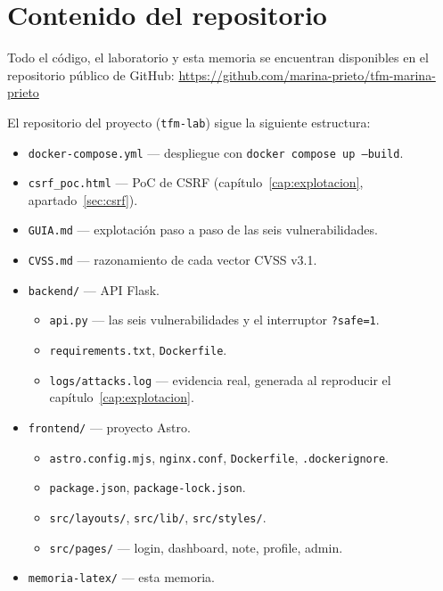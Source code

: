 \chapter*{Contenido del repositorio}

Todo el código, el laboratorio \breachlab y esta memoria se encuentran
disponibles en el repositorio público de GitHub: 
\url{https://github.com/marina-prieto/tfm-marina-prieto}

El repositorio del proyecto (\texttt{tfm-lab}) 
sigue la siguiente estructura:

\begin{itemize}
\item \texttt{docker-compose.yml} — despliegue con \texttt{docker compose up
  --build}.
\item \texttt{csrf\_poc.html} — PoC de CSRF (capítulo~\ref{cap:explotacion},
  apartado~\ref{sec:csrf}).
\item \texttt{GUIA.md} — explotación paso a paso de las seis
  vulnerabilidades.
\item \texttt{CVSS.md} — razonamiento de cada vector CVSS v3.1.
\item \texttt{backend/} — API Flask.
  \begin{itemize}
  \item \texttt{api.py} — las seis vulnerabilidades y el interruptor
    \texttt{?safe=1}.
  \item \texttt{requirements.txt}, \texttt{Dockerfile}.
  \item \texttt{logs/attacks.log} — evidencia real, generada al reproducir
    el capítulo~\ref{cap:explotacion}.
  \end{itemize}
\item \texttt{frontend/} — proyecto Astro.
  \begin{itemize}
  \item \texttt{astro.config.mjs}, \texttt{nginx.conf}, \texttt{Dockerfile},
    \texttt{.dockerignore}.
  \item \texttt{package.json}, \texttt{package-lock.json}.
  \item \texttt{src/layouts/}, \texttt{src/lib/}, \texttt{src/styles/}.
  \item \texttt{src/pages/} — login, dashboard, note, profile, admin.
  \end{itemize}
\item \texttt{memoria-latex/} — esta memoria.
  \begin{itemize}

\end{itemize}
\end{itemize}
